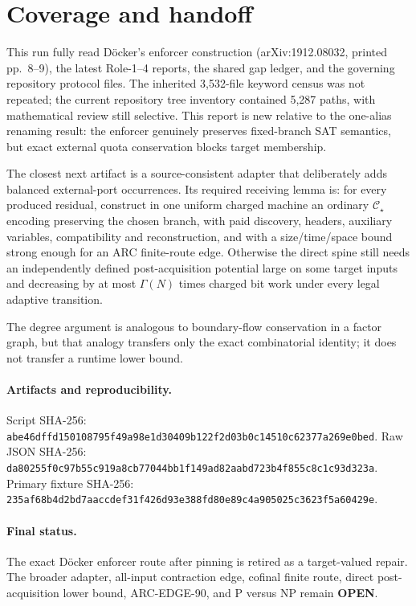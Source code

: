 \documentclass[11pt]{article}
\newcommand{\CS}{\mathcal C_\star}
\newcommand{\OPEN}{\textbf{OPEN}}
\begin{document}
\section{Coverage and handoff}
This run fully read D\"ocker's enforcer construction (arXiv:1912.08032,
printed pp.~8--9), the latest Role-1--4 reports, the shared gap ledger, and the
governing repository protocol files.  The inherited 3,532-file keyword census
was not repeated; the current repository tree inventory contained 5,287 paths,
with mathematical review still selective.  This report is new relative to the
one-alias renaming result: the enforcer genuinely preserves fixed-branch SAT
semantics, but exact external quota conservation blocks target membership.

The closest next artifact is a source-consistent adapter that deliberately
adds balanced external-port occurrences.  Its required receiving lemma is:
for every produced residual, construct in one uniform charged machine an
ordinary $\CS$ encoding preserving the chosen branch, with paid discovery,
headers, auxiliary variables, compatibility and reconstruction, and with a
size/time/space bound strong enough for an ARC finite-route edge.  Otherwise
the direct spine still needs an independently defined post-acquisition
potential large on some target inputs and decreasing by at most
$\Gamma(N)$ times charged bit work under every legal adaptive transition.

The degree argument is analogous to boundary-flow conservation in a factor
graph, but that analogy transfers only the exact combinatorial identity; it
does not transfer a runtime lower bound.

\paragraph{Artifacts and reproducibility.}
Script SHA-256:
\texttt{abe46dffd150108795f49a98e1d30409b122f2d03b0c14510c62377a269e0bed}.
Raw JSON SHA-256:
\texttt{da80255f0c97b55c919a8cb77044bb1f149ad82aabd723b4f855c8c1c93d323a}.
Primary fixture SHA-256:
\texttt{235af68b4d2bd7aaccdef31f426d93e388fd80e89c4a905025c3623f5a60429e}.

\paragraph{Final status.}
The exact D\"ocker enforcer route after pinning is retired as a target-valued
repair.  The broader adapter, all-input contraction edge, cofinal finite route,
direct post-acquisition lower bound, ARC-EDGE-90, and P versus NP remain \OPEN.
\end{document}
